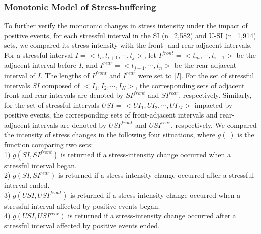 \subsubsection{Monotonic Model of Stress-buffering}
\label{sec:mono}
To further verify the monotonic changes in stress intensity under the impact of positive events,
for each stressful interval in the SI (n=2,582) and U-SI (n=1,914) sets,
we compared its stress intensity with the front- and rear-adjacent intervals.
For a stressful interval $I = <t_i,t_{i+1},\cdots,t_j>$,
let $I^{front} = <t_m,\cdots,t_{i-1}>$ be the adjacent interval before $I$,
and $I^{rear} = <t_{j+1},\cdots,t_n>$ be the rear-adjacent interval of $I$.
The lengths of $I^{front}$ and $I^{rear}$ were set to $|I|$.
For the set of stressful intervals $SI$ composed of $<I_1,I_2,\cdots,I_N>$,
the corresponding sets of adjacent front and rear intervals are denoted by $SI^{front}$ and $SI^{rear}$, respectively.
Similarly, for the set of stressful intervals $USI$ = $<UI_1,UI_2,\cdots, UI_M>$ impacted by positive events,
the corresponding sets of front-adjacent intervals and rear-adjacent intervals are denoted by $USI^{front}$ and $USI^{rear}$, respectively.
We compared the intensity of stress changes in the following four situations,
where $g(.)$ is the function comparing two sets: \\
1) \small{$g(SI,SI^{front})$} is returned if a stress-intensity change occurred when a stressful interval began.\\
2) \small{$g(SI,SI^{rear})$} is returned if a stress-intensity change occurred after a stressful interval ended.\\
3) \small{$g(USI,USI^{front})$} is returned if a stress-intensity change occurred when a stressful interval affected by positive events began.\\
4) \small{$g(USI,USI^{rear})$} is returned if a stress-intensity change occurred after a stressful interval affected by positive events ended.

